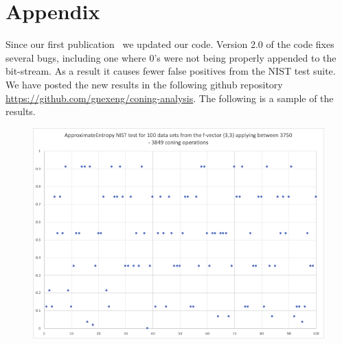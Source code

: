 \documentclass[oneside,12pt]{amsart}
\theoremstyle{definition}
\numberwithin{equation}{section}
\begin{document}

\clearpage
\section{Appendix} \label{appendix}


Since our first publication~\cite{ALDH} we updated our code. Version 2.0 of the code fixes several bugs, including one where 0's were not being properly appended to the bit-stream. As a result it causes fewer false positives from the NIST test suite. We have posted the new results in the following github repository \url{https://github.com/gnexeng/coning-analysis}. The following is a sample of the results. 

\begin{figure}[h!]
\centering
\includegraphics[scale=.5]{./charts/ApproximateEntropy_3_3.png}
\label{fig:approxentropy33}
\end{figure}
\end{document}
